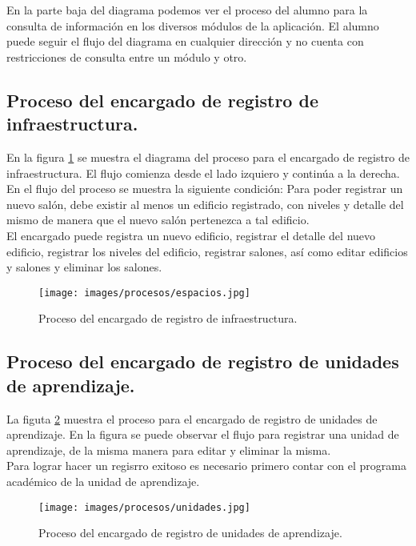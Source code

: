 En la parte baja del diagrama podemos ver el proceso del alumno para la consulta de información en los diversos módulos de la aplicación. El alumno puede seguir el flujo del diagrama en cualquier dirección y no cuenta con restricciones de consulta entre un módulo y otro.

\subsection{Proceso del encargado de registro de infraestructura.}

En la figura \ref{fig:espacios} se muestra el diagrama del proceso para el encargado de registro de infraestructura. El flujo comienza desde el lado izquiero y continúa a la derecha. \\

En el flujo del proceso se muestra la siguiente condición:
Para poder registrar un nuevo salón, debe existir al menos un edificio registrado, con niveles y detalle del mismo de manera que el nuevo salón pertenezca a tal edificio. \\

El encargado puede registra un nuevo edificio, registrar el detalle del nuevo edificio, registrar los niveles del edificio, registrar salones, así como editar edificios y salones y eliminar los salones.

\begin{figure}[h!]
	\begin{center}
		\texttt{[image: images/procesos/espacios.jpg]}
		\caption{Proceso del encargado de registro de infraestructura.}
		\label{fig:espacios}
	\end{center}
\end{figure}

\subsection{Proceso del encargado de registro de unidades de aprendizaje.}

La figuta \ref{fig:unidades} muestra el proceso para el encargado de registro de unidades de aprendizaje. En la figura se puede observar el flujo para registrar una unidad de aprendizaje, de la misma manera para editar y eliminar la misma. \\

Para lograr hacer un regisrro exitoso es necesario primero contar con el programa académico de la unidad de aprendizaje. 

\begin{figure}[h!]
	\begin{center}
		\texttt{[image: images/procesos/unidades.jpg]}
		\caption{Proceso del encargado de registro de unidades de aprendizaje.}
		\label{fig:unidades}
	\end{center}
\end{figure}

